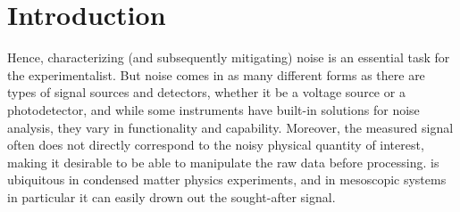 \chapter{Introduction}\label{ch:speck:introduction}
Hence, characterizing (and subsequently mitigating) noise is an essential task for the experimentalist.
But noise comes in as many different forms as there are types of signal sources and detectors, whether it be a voltage source or a photodetector, and while some instruments have built-in solutions for noise analysis, they vary in functionality and capability.
Moreover, the measured signal often does not directly correspond to the noisy physical quantity of interest, making it desirable to be able to manipulate the raw data before processing.
 is ubiquitous in condensed matter physics experiments, and in mesoscopic systems in particular it can easily drown out the sought-after signal.

